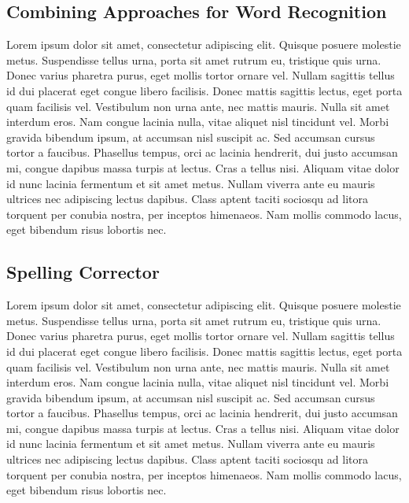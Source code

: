 \documentclass[12pt]{article}
\begin{document}
	\subsection{Combining Approaches for Word Recognition}
	\label{subsection:combined}
	Lorem ipsum dolor sit amet, consectetur adipiscing elit. Quisque posuere molestie metus. Suspendisse tellus urna, porta sit amet rutrum eu, tristique quis urna. Donec varius pharetra purus, eget mollis tortor ornare vel. Nullam sagittis tellus id dui placerat eget congue libero facilisis. Donec mattis sagittis lectus, eget porta quam facilisis vel. Vestibulum non urna ante, nec mattis mauris. Nulla sit amet interdum eros. Nam congue lacinia nulla, vitae aliquet nisl tincidunt vel. Morbi gravida bibendum ipsum, at accumsan nisl suscipit ac. Sed accumsan cursus tortor a faucibus. Phasellus tempus, orci ac lacinia hendrerit, dui justo accumsan mi, congue dapibus massa turpis at lectus. Cras a tellus nisi. Aliquam vitae dolor id nunc lacinia fermentum et sit amet metus. Nullam viverra ante eu mauris ultrices nec adipiscing lectus dapibus. Class aptent taciti sociosqu ad litora torquent per conubia nostra, per inceptos himenaeos. Nam mollis commodo lacus, eget bibendum risus lobortis nec.


	\subsection{Spelling Corrector}
	\label{subsection:spellingcheck}
	Lorem ipsum dolor sit amet, consectetur adipiscing elit. Quisque posuere molestie metus. Suspendisse tellus urna, porta sit amet rutrum eu, tristique quis urna. Donec varius pharetra purus, eget mollis tortor ornare vel. Nullam sagittis tellus id dui placerat eget congue libero facilisis. Donec mattis sagittis lectus, eget porta quam facilisis vel. Vestibulum non urna ante, nec mattis mauris. Nulla sit amet interdum eros. Nam congue lacinia nulla, vitae aliquet nisl tincidunt vel. Morbi gravida bibendum ipsum, at accumsan nisl suscipit ac. Sed accumsan cursus tortor a faucibus. Phasellus tempus, orci ac lacinia hendrerit, dui justo accumsan mi, congue dapibus massa turpis at lectus. Cras a tellus nisi. Aliquam vitae dolor id nunc lacinia fermentum et sit amet metus. Nullam viverra ante eu mauris ultrices nec adipiscing lectus dapibus. Class aptent taciti sociosqu ad litora torquent per conubia nostra, per inceptos himenaeos. Nam mollis commodo lacus, eget bibendum risus lobortis nec.
	
	
\end{document}
